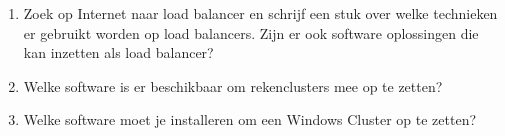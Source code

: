 \begin{enumerate}
\item Zoek op Internet naar load balancer en schrijf een stuk over welke technieken er gebruikt worden op load balancers. Zijn er ook software oplossingen die kan inzetten als load balancer?
\item Welke software is er beschikbaar om rekenclusters mee op te zetten?
\item Welke software moet je installeren om een Windows Cluster op te zetten?
\end{enumerate}
